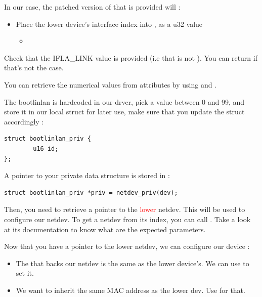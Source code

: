  In our case, the patched version of  that is provided will :
 \begin{itemize}
	 \item Place the lower device's interface index into , as a u32 value
		 \begin{itemize}
			\item {}\textcolor{red}{}
		 \end{itemize}
 \end{itemize}

 Check that the IFLA\_LINK value is provided (i.e that  is not ). You can return  if that's not the case.

You can retrieve the numerical values from attributes by using and .

The bootlinlan  is hardcoded in our drver, pick a value between 0 and 99, and store it in our local  struct for later use, make sure that you update the struct accordingly :

\begin{verbatim}
struct bootlinlan_priv {
        u16 id;
};
\end{verbatim}

A pointer to your private data structure is stored in  :

\begin{verbatim}
struct bootlinlan_priv *priv = netdev_priv(dev);
\end{verbatim}

Then, you need to retrieve a pointer to the \textcolor{red}{lower} netdev. This will be used to configure our netdev.
To get a netdev from its index, you can call . Take a look at its documentation to know what are the expected parameters.

Now that you have a pointer to the lower netdev, we can configure our device :

\begin{itemize}
	\item The  that backs our netdev is the same as the lower device's. We can use  to set it.
	\item We want to inherit the same MAC address as the lower dev. Use  for that.
\end{itemize}

